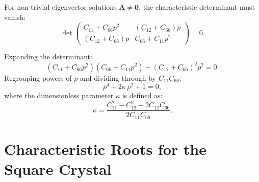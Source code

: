 \documentclass[11pt,a4paper]{article}
\begin{document}
For non-trivial eigenvector solutions $\bm{A} \neq \bm{0}$, the characteristic determinant must vanish:
\begin{equation}
\det
\begin{pmatrix}
C_{11} + C_{66} p^2 & (C_{12} + C_{66}) p \\
(C_{12} + C_{66}) p & C_{66} + C_{11} p^2
\end{pmatrix}
= 0.
\end{equation}

Expanding the determinant:
\begin{equation}
(C_{11} + C_{66} p^2)(C_{66} + C_{11} p^2) - (C_{12} + C_{66})^2 p^2 = 0.
\end{equation}
Regrouping powers of $p$ and dividing through by $C_{11} C_{66}$:
\begin{equation}
p^4 + 2 \kappa \, p^2 + 1 = 0,
\label{eq:biquadratic}
\end{equation}
where the dimensionless parameter $\kappa$ is defined as:
\begin{equation}
\kappa = \frac{C_{11}^2 - C_{12}^2 - 2 C_{12} C_{66}}{2 C_{11} C_{66}}.
\end{equation}

\section{Characteristic Roots for the Square Crystal}
\end{document}
